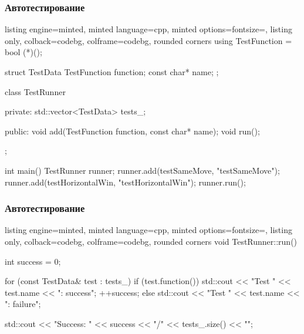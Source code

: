 \documentclass[10pt]{beamer}
\begin{document}
\begin{frame}[fragile]
\frametitle{Автотестирование}
\begin{itemize}
\begin{tcblisting}{listing engine=minted, minted language=cpp, minted options={fontsize=\scriptsize}, listing only, colback=codebg, colframe=codebg, rounded corners}
using TestFunction = bool (*)();

struct TestData {
  TestFunction function;
  const char* name;
};

class TestRunner {
private:
  std::vector<TestData> tests_;

public:
  void add(TestFunction function, const char* name);
  void run();
};

int main() {
  TestRunner runner;
  runner.add(testSameMove, "testSameMove");
  runner.add(testHorizontalWin, "testHorizontalWin");
  runner.run();
}
\end{tcblisting}
\end{itemize}
\end{frame}

\begin{frame}[fragile]
\frametitle{Автотестирование}
\begin{itemize}
\begin{tcblisting}{listing engine=minted, minted language=cpp, minted options={fontsize=\scriptsize}, listing only, colback=codebg, colframe=codebg, rounded corners}
void TestRunner::run() {
  int success = 0;

  for (const TestData& test : tests_) {
    if (test.function()) {
      std::cout << "Test " << test.name << ": success\n";
      ++success;
    } else {
      std::cout << "Test " << test.name << ": failure\n";
    }
  }

  std::cout << "Success: " << success << "/"
    << tests_.size() << "\n";
}
\end{tcblisting}
\end{itemize}
\end{frame}
\end{document}
